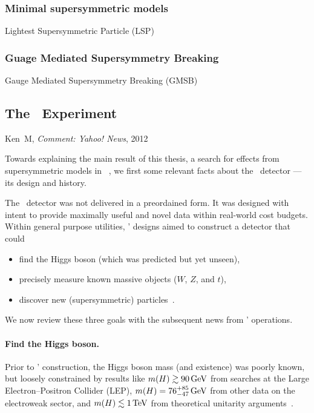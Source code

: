 \subsubsection{Minimal supersymmetric models}
Lightest Supersymmetric Particle (LSP)


\subsubsection{Guage Mediated Supersymmetry Breaking}
Gauge Mediated Supersymmetry Breaking (GMSB)



\begin{singlespacing}
\section{The \atlas\ Experiment}
%
\begin{epigraphs}
%
{Ken~M,
\textit{Comment: Yahoo! News},
2012~\cite{kenm2012inner}}
\end{epigraphs}
\end{singlespacing}

Towards explaining the main result of this thesis,
a search for effects from supersymmetric models in
\atlas~\cite{atlas2022searches},
we first some relevant facts about the \atlas\ detector ---
its design and history.

The \atlas\ detector was not delivered in a preordained form.
It was designed with intent to provide maximally useful and novel data within
real-world cost budgets.
Within general purpose utilities, \atlas' designs aimed to construct a
detector that could
\begin{itemize}
\item find the Higgs boson (which was predicted but yet unseen),
\item precisely measure known massive objects ($W$, $Z$, and $t$),
\item discover new (supersymmetric) particles~\cite{atlas1999design1}.
\end{itemize}
We now review these three goals with the subsequent news from \atlas'
operations.

\paragraph{Find the Higgs boson.}
Prior to \atlas' construction, the Higgs boson mass (and existence) was
poorly known, but loosely constrained by results like
$m(H) \gtrsim 90\,\eV[G]$ from searches at the
Large Electron–Positron Collider (LEP),
$m(H) = 76^{+85}_{-47}\,\eV[G]$ from other data on the electroweak sector,
and $m(H) \lesssim 1\,\eV[T]$ from theoretical unitarity arguments~\cite{
atlas1999design2,
ghinculov1998perturb,
lep1999ewk
}.

